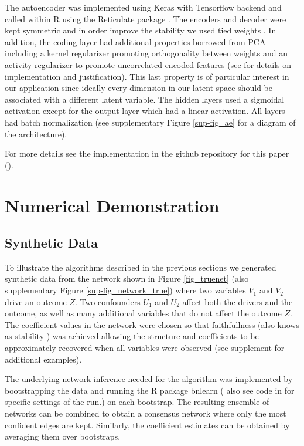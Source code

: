 \documentclass{article}
\begin{document}
The autoencoder was implemented using Keras with Tensorflow backend and called within R using the Reticulate package \cite{reticulate_2020}. The encoders and decoder were kept symmetric and in order improve the stability we used tied weights \cite{pca_ae}. In addition, the coding layer had additional properties borrowed from PCA including a kernel regularizer promoting orthogonality between weights and an activity regularizer to promote uncorrelated encoded features (see \cite{ranjan_build_2019} for details on implementation and justification). This last property is of particular interest in our application since ideally every dimension in our latent space should be associated with a different latent variable. The hidden layers used a sigmoidal activation except for the output layer which had a linear activation. All layers had batch normalization \cite{ioffe2015batch} (see supplementary Figure \ref{sup-fig_ae} for a diagram of the architecture).

For more details see the implementation in the github repository for this paper (\cite{latent_2020}).

\section{Numerical Demonstration}
\subsection{Synthetic Data}
To illustrate  the algorithms described in the previous sections we
generated synthetic data from the network shown in Figure
\ref{fig_truenet} (also supplementary Figure \ref{sup-fig_network_true}) where two variables $V_1$ and $V_2$ drive an outcome
$Z$. Two confounders $U_1$ and $U_2$ affect both the drivers and the
outcome, as well as many additional variables that do not affect the
outcome $Z$.
The coefficient values in the network were chosen so that faithfullness (also knows as stability \cite{pearl_causality:_2000}) was achieved allowing the structure and coefficients to be  approximately recovered when all variables were observed (see supplement for additional examples).

The underlying network inference needed for the algorithm was implemented by bootstrapping the data  and running the R package bnlearn (\cite{scutari_learning_2010} also see code in \cite{latent_2020} for specific settings of the run.) on each bootstrap.  The resulting ensemble of networks can be combined to obtain a consensus network where only the most confident edges are kept. Similarly, the coefficient estimates can be obtained by averaging them over bootstraps.
\end{document}
